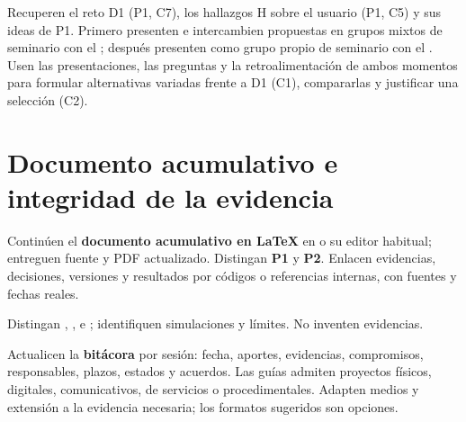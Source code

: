 Recuperen el reto D1 (P1, C7), los hallazgos H sobre el usuario (P1, C5) y sus ideas de P1. Primero presenten e intercambien propuestas en grupos mixtos de seminario con el ; después presenten como grupo propio de seminario con el . Usen las presentaciones, las preguntas y la retroalimentación de ambos momentos para formular alternativas variadas frente a D1 (C1), compararlas y justificar una selección (C2).

\section*{Documento acumulativo e integridad de la evidencia}
Continúen el \textbf{documento acumulativo en LaTeX} en  o su editor habitual; entreguen fuente y PDF actualizado. Distingan \textbf{P1} y \textbf{P2}. Enlacen evidencias, decisiones, versiones y resultados por códigos o referencias internas, con fuentes y fechas reales.

Distingan , ,  e ; identifiquen simulaciones y límites.  No inventen evidencias.

Actualicen la \textbf{bitácora} por sesión: fecha, aportes, evidencias, compromisos, responsables, plazos, estados y acuerdos. Las guías admiten proyectos físicos, digitales, comunicativos, de servicios o procedimentales. Adapten medios y extensión a la evidencia necesaria; los formatos sugeridos son opciones.

